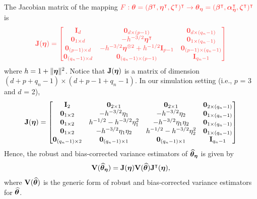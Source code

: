 
The Jacobian matrix of the mapping $\x F: \Bt = (\Bb^\p,\Be^\p,\Bz^\p)^\p \rightarrow  \Bt_{\Be} = (\Bb^\p,\Ba_{\Be}^\p,\Bz^\p)^\p$ is
$$
\x\BJ(\Be) = \begin{bmatrix}
	\BI_d                        & \mathbf{0}_{d\times(p-1)}                  & \mathbf{0}_{d\times(q_n-1)}\\
	\mathbf{0}_{1\times d}       & -h^{-3/2}\Be^\p                            & \mathbf{0}_{1\times(q_n-1)} \\
	\mathbf{0}_{(p-1)\times d}   & -h^{-3/2}\Be^{\otimes 2}+h^{-1/2}\BI_{p-1} & \mathbf{0}_{(p-1)\times(q_n-1)}     \\
	\mathbf{0}_{(q_n-1)\times d} & \mathbf{0}_{(q_n-1)\times(p-1)}              & \BI_{q_n-1}
\end{bmatrix}
$$
where $h = 1+\|\bm\eta\|^2$. Notice that $\mathbf{J}(\bm\eta)$ is a matrix of dimension $(d+p+q_n-1)\times(d+p-1+q_n-1)$. In our simulation setting (i.e., $p$ = 3 and $d$ = 2),
$$
\mathbf{J}(\bm\eta) = \begin{bmatrix}
	\mathbf{I}_2                        & \mathbf{0}_{2\times 1} &  \mathbf{0}_{2\times 1} & \mathbf{0}_{2\times(q_n-1)}\\
	\mathbf{0}_{1\times 2}       & -h^{-3/2}\eta_1 & -h^{-3/2}\eta_2  & \mathbf{0}_{1\times(q_n-1)}\\
	\mathbf{0}_{1\times 2}       & h^{-1/2}-h^{-3/2}\eta_1^2 & -h^{-3/2}\eta_1\eta_2  & \mathbf{0}_{1\times(q_n-1)}\\
	\mathbf{0}_{1\times 2}       & -h^{-3/2}\eta_1\eta_2  & h^{-1/2}-h^{-3/2}\eta_2^2  & \mathbf{0}_{1\times(q_n-1)}\\
	\mathbf{0}_{(q_n-1)\times 2} & \mathbf{0}_{(q_n-1)\times 1}                       &    \mathbf{0}_{(q_n-1)\times 1}                            & \mathbf{I}_{q_n-1}
\end{bmatrix}
$$
Hence, the robust and bias-corrected variance estimators of $\widehat{\bm\theta}_{\bm\eta}$ is given by   
$$
\mathbf{V}(\widehat{\bm\theta}_{\bm\eta}) = \mathbf{J}(\bm\eta)\mathbf{V}(\widehat{\bm\theta})\mathbf{J}^\intercal(\bm\eta),
$$ 
where $\mathbf{V}(\widehat{\bm\theta})$ is the generic form of robust and bias-corrected variance estimators for $\widehat{\bm\theta}$. 


 

